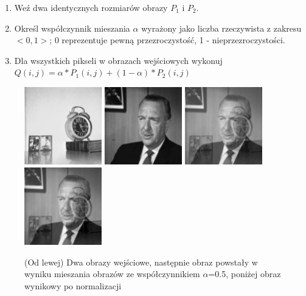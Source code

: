 \documentclass[final,a4paper,openany,12pt]{mwbk}
\begin{document}
	\begin{enumerate}	
		\item Weź dwa identycznych rozmiarów obrazy $P_{1}$ i $P_{2}$.
		\item Określ współczynnik mieszania $\alpha$ wyrażony jako liczba rzeczywista z zakresu $< 0,1 >$; 0 reprezentuje pewną przezroczystość, 1 - nieprzezroczystości. 
		\item Dla wszystkich pikseli w obrazach wejściowych wykonuj $Q(i,j) = \alpha * P_{1}(i,j) + (1 - \alpha) * P_{2}(i,j)$
	\end{enumerate}


\begin{figure}[H]
	\begin{center}
		\includegraphics[width=0.3\textwidth]{1/1Gray_Img1_Mix_Original}
		\includegraphics[width=0.3\textwidth]{1/1Gray_Img2_Mix_Original}
		\includegraphics[width=0.3\textwidth]{1/1Gray_Img_Mix_Result}
		\includegraphics[width=0.3\textwidth]{1/1Gray_Img_Mix_Result_Norm}
	\end{center}
	\caption{(Od lewej) Dwa obrazy wejściowe, następnie obraz powstały w wyniku mieszania obrazów ze współczynnikiem $\alpha$=0.5, poniżej obraz wynikowy po normalizacji }
\end{figure}
\end{document}
